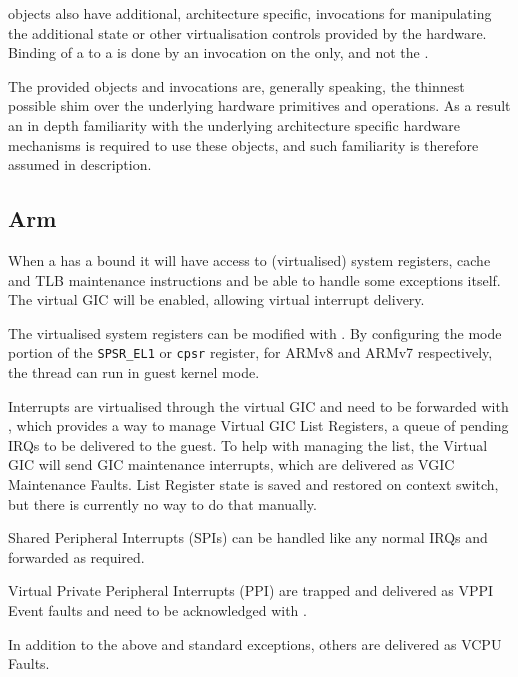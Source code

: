  objects also have additional, architecture specific, invocations for manipulating
the additional state or other virtualisation controls provided by the hardware. Binding of
a  to a  is done by an invocation on the  only, and not the .

The provided objects and invocations are, generally speaking, the thinnest possible shim over
the underlying hardware primitives and operations. As a result an in depth familiarity with
the underlying architecture specific hardware mechanisms is required to use these objects, and
such familiarity is therefore assumed in description.

\subsection{Arm}
\label{sec:virt-arm}

When a  has a bound  it will have access to (virtualised) system registers,
cache and TLB maintenance instructions and be able to handle some exceptions itself.
The virtual GIC will be enabled, allowing virtual interrupt delivery.

The virtualised system registers can be modified with .
By configuring the mode portion of the \texttt{SPSR\_EL1} or \texttt{cpsr} register,
for ARMv8 and ARMv7 respectively, the thread can run in guest kernel mode.

Interrupts are virtualised through the virtual GIC and need to be forwarded with
, which provides a way to manage
Virtual GIC List Registers, a queue of pending IRQs to be delivered to the guest. To help
with managing the list, the Virtual GIC will send GIC maintenance interrupts, which are
delivered as VGIC Maintenance Faults. List Register state is saved and restored on 
context switch, but there is currently no way to do that manually.

Shared Peripheral Interrupts (SPIs) can be handled like any normal IRQs and forwarded as required.

Virtual Private Peripheral Interrupts (PPI) are trapped and delivered as VPPI Event faults and need
to be acknowledged with .

In addition to the above and standard exceptions, others are delivered as VCPU Faults.

